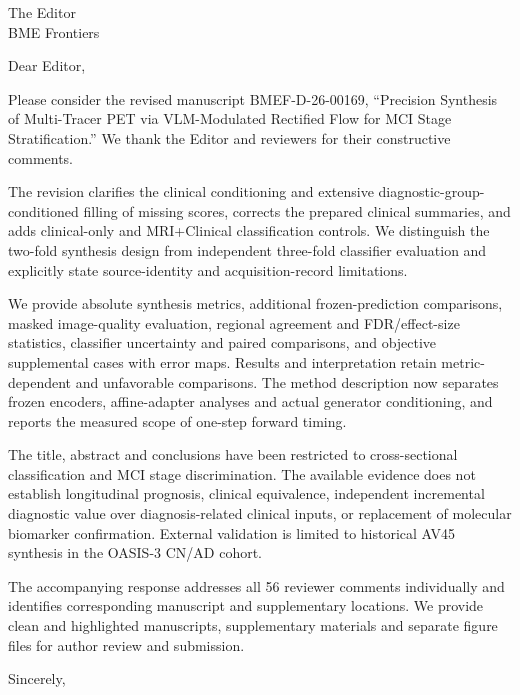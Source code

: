 \documentclass[11pt]{letter}
\date{4 November 2026}
\begin{document}
\begin{letter}{The Editor\\BME Frontiers}
\opening{Dear Editor,}
Please consider the revised manuscript BMEF-D-26-00169, ``Precision Synthesis of Multi-Tracer PET via VLM-Modulated Rectified Flow for MCI Stage Stratification.'' We thank the Editor and reviewers for their constructive comments.

The revision clarifies the clinical conditioning and extensive diagnostic-group-conditioned filling of missing scores, corrects the prepared clinical summaries, and adds clinical-only and MRI+Clinical classification controls. We distinguish the two-fold synthesis design from independent three-fold classifier evaluation and explicitly state source-identity and acquisition-record limitations.

We provide absolute synthesis metrics, additional frozen-prediction comparisons, masked image-quality evaluation, regional agreement and FDR/effect-size statistics, classifier uncertainty and paired comparisons, and objective supplemental cases with error maps. Results and interpretation retain metric-dependent and unfavorable comparisons. The method description now separates frozen encoders, affine-adapter analyses and actual generator conditioning, and reports the measured scope of one-step forward timing.

The title, abstract and conclusions have been restricted to cross-sectional classification and MCI stage discrimination. The available evidence does not establish longitudinal prognosis, clinical equivalence, independent incremental diagnostic value over diagnosis-related clinical inputs, or replacement of molecular biomarker confirmation. External validation is limited to historical AV45 synthesis in the OASIS-3 CN/AD cohort.

The accompanying response addresses all 56 reviewer comments individually and identifies corresponding manuscript and supplementary locations. We provide clean and highlighted manuscripts, supplementary materials and separate figure files for author review and submission.
\closing{Sincerely,}
\end{letter}
\end{document}
